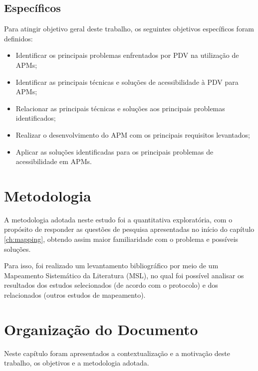 \subsection{Específicos}

Para atingir objetivo geral deste trabalho, os seguintes objetivos específicos foram definidos:

\begin{itemize}
    \item Identificar os principais problemas enfrentados por PDV na utilização de APMs;
    \item Identificar as principais técnicas e soluções de acessibilidade à PDV para APMs;
    \item Relacionar as principais técnicas e soluções aos principais problemas identificados;
    \item Realizar o desenvolvimento do APM com os principais requisitos levantados;
    \item Aplicar as soluções identificadas para os principais problemas de acessibilidade em APMs\@.
\end{itemize}

\section{Metodologia}

A metodologia adotada neste estudo foi a quantitativa exploratória, com o propósito de responder as questões de pesquisa apresentadas
no início do capítulo \ref{ch:mapping}, obtendo assim maior familiaridade com o problema e possíveis soluções.

Para isso, foi realizado um levantamento bibliográfico por meio de um Mapeamento Sistemático da Literatura (MSL), no qual foi possível
analisar os resultados dos estudos selecionados (de acordo com o protocolo) e dos relacionados (outros estudos de mapeamento).

\section{Organização do Documento}
Neste capítulo foram apresentados a contextualização e a motivação deste trabalho, os objetivos e a metodologia adotada.

